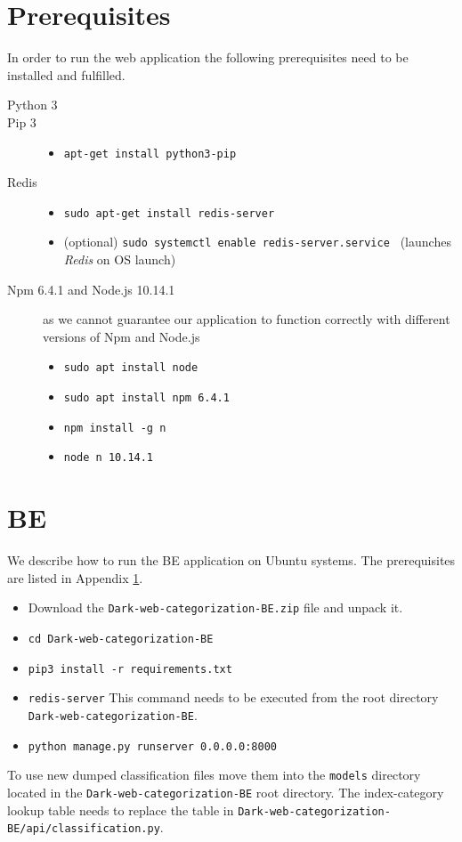 \begin{appendices}
\section{Prerequisites} \label{dixAppPrerequisites}
In order to run the web application the following prerequisites need to be installed and fulfilled.
\begin{description}
    \item[Python 3] \hfill
    \item[Pip 3] \hfill 
        \begin{itemize}
            \item \texttt{apt-get install python3-pip}
        \end{itemize}
    \item[Redis] \hfill 
        \begin{itemize}
            \item \texttt{sudo apt-get install redis-server}
            \item (optional) \texttt{sudo systemctl enable redis-server.service } (launches \textit{Redis} on OS launch)
        \end{itemize}
    \item[Npm 6.4.1 and Node.js 10.14.1] as we cannot guarantee our application to function correctly with different versions of Npm and Node.js
        \begin{itemize}
            \item \texttt{sudo apt install node}
            \item \texttt{sudo apt install npm 6.4.1}
            \item \texttt{npm install -g n}
            \item \texttt{node n 10.14.1}
        \end{itemize}
\end{description}

\section{BE}
We describe how to run the BE application on Ubuntu systems. The prerequisites are listed in Appendix \ref{dixAppPrerequisites}.
\begin{itemize}
    \item Download the \texttt{Dark-web-categorization-BE.zip} file and unpack it.
    \item \texttt{cd Dark-web-categorization-BE}
    \item \texttt{pip3 install -r requirements.txt}
    \item \texttt{redis-server} This command needs to be executed from the root directory \texttt{Dark-web-categorization-BE}.
    \item \texttt{python manage.py runserver 0.0.0.0:8000}
\end{itemize}
To use new dumped classification files move them into the \texttt{models} directory located in the \texttt{Dark-web-categorization-BE} root directory. The index-category lookup table needs to replace the table in \texttt{Dark-web-categorization-BE/api/classification.py}.


\end{appendices}
